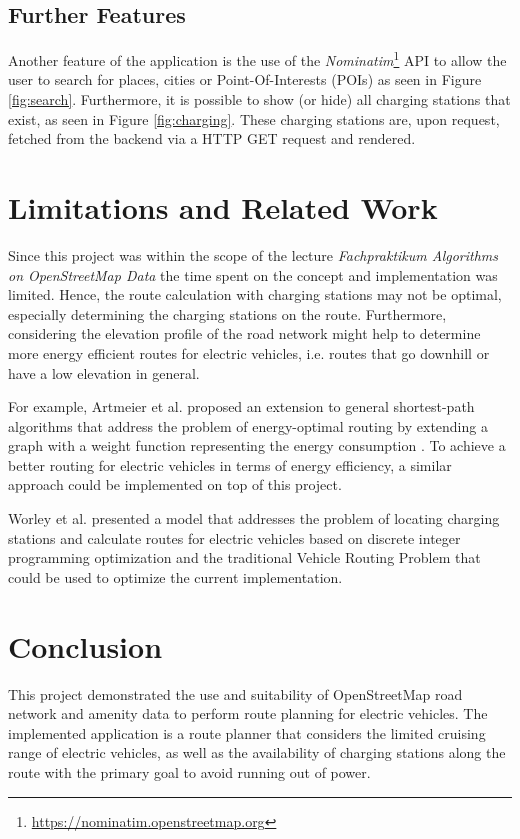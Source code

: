 \documentclass[a4paper]{article}
\begin{document}
\subsection{Further Features}
Another feature of the application is the use of the \textit{Nominatim}\footnote{\url{https://nominatim.openstreetmap.org}} API to allow the user to search for places, cities or Point-Of-Interests (POIs) as seen in Figure \ref{fig:search}.
Furthermore, it is possible to show (or hide) all charging stations that exist, as seen in Figure \ref{fig:charging}.
These charging stations are, upon request, fetched from the backend via a HTTP GET request and rendered.
\section{Limitations and Related Work}
Since this project was within the scope of the lecture \textit{Fachpraktikum Algorithms on OpenStreetMap Data} the time spent on the concept and implementation was limited.
Hence, the route calculation with charging stations may not be optimal, especially determining the charging stations on the route.
Furthermore, considering the elevation profile of the road network might help to determine more energy efficient routes for electric vehicles, i.e. routes that go downhill or have a low elevation in general.\par\medskip
For example, Artmeier et al. \cite{Artmeier2010} proposed an extension to general shortest-path algorithms that address the problem of energy-optimal routing by extending a graph with a weight function representing the energy consumption \cite{Artmeier2010}.
To achieve a better routing for electric vehicles in terms of energy efficiency, a similar approach could be implemented on top of this project.\par\medskip
Worley et al. \cite{Worley2012} presented a model that addresses the problem of locating charging stations and calculate routes for electric vehicles based on discrete integer programming optimization and the traditional Vehicle Routing Problem \cite{Worley2012} that could be used to optimize the current implementation.
\section{Conclusion}
This project demonstrated the use and suitability of OpenStreetMap road network and amenity data to perform route planning for electric vehicles.
The implemented application is a route planner that considers the limited cruising range of electric vehicles, as well as the availability of charging stations along the route with the primary goal to avoid running out of power.


\end{document}
